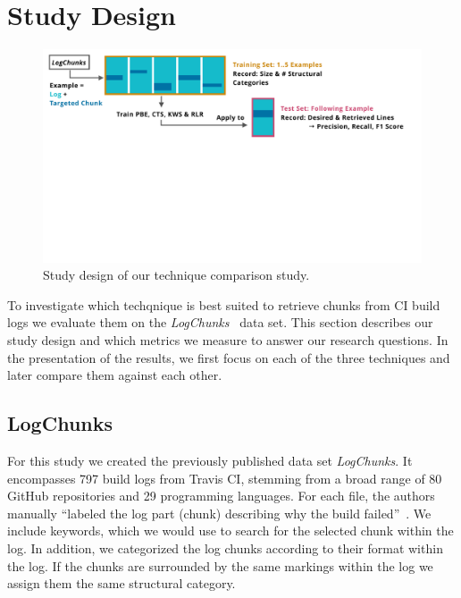 
\section{Study Design}
\label{sec:study}

\begin{figure}[tb]
	\centering
	\includegraphics[width=\textwidth, trim={0.4cm 8.4cm 1.2cm 0.3cm}, clip]{img/study.pdf}
	\caption{Study design of our technique comparison study.}
	\label{fig:study}
\end{figure}

To investigate which techqnique is best suited to retrieve chunks from
CI build logs we evaluate them on the
\emph{LogChunks}~\cite{brandt2020logchunks} data set. This section
describes our study design and which metrics we measure to answer our
research questions. In the presentation of the results, we first focus
on each of the three techniques and later compare them against each
other.

\subsection{LogChunks}
For this study we created the previously published data set
\emph{LogChunks}. It encompasses 797 build logs from Travis CI,
stemming from a broad range of 80 GitHub repositories and 29
programming languages. For each file, the authors manually ``labeled
the log part (chunk) describing why the build
failed''~\cite{brandt2020logchunks}. We include keywords, which we
would use to search for the selected chunk within the log. In
addition, we categorized the log chunks according to their format
within the log. If the chunks are surrounded by the same markings
within the log we assign them the same structural category.

